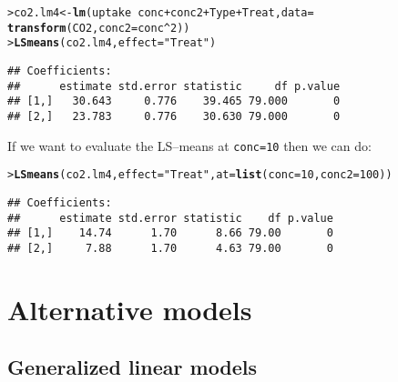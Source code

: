 \documentclass[11pt]{article}\usepackage[]{graphicx}\usepackage[]{color}
\makeatletter
\newcommand{\hlnum}[1]{\textcolor[rgb]{0.686,0.059,0.569}{#1}}%
\newcommand{\hlstr}[1]{\textcolor[rgb]{0.192,0.494,0.8}{#1}}%
\newcommand{\hlopt}[1]{\textcolor[rgb]{0,0,0}{#1}}%
\newcommand{\hlstd}[1]{\textcolor[rgb]{0.345,0.345,0.345}{#1}}%
\newcommand{\hlkwb}[1]{\textcolor[rgb]{0.69,0.353,0.396}{#1}}%
\newcommand{\hlkwc}[1]{\textcolor[rgb]{0.333,0.667,0.333}{#1}}%
\newcommand{\hlkwd}[1]{\textcolor[rgb]{0.737,0.353,0.396}{\textbf{#1}}}%
\newenvironment{kframe}{%
 \def\at@end@of@kframe{}%
 \ifinner\ifhmode%
  \def\at@end@of@kframe{\end{minipage}}%
  \begin{minipage}{\columnwidth}%
 \fi\fi%
 \def\FrameCommand##1{\hskip\@totalleftmargin \hskip-\fboxsep
 \colorbox{shadecolor}{##1}\hskip-\fboxsep
     \hskip-\linewidth \hskip-\@totalleftmargin \hskip\columnwidth}%
 \MakeFramed {\advance\hsize-\width
   \@totalleftmargin\z@ \linewidth\hsize
   \@setminipage}}%
 {\par\unskip\endMakeFramed%
 \at@end@of@kframe}
\newenvironment{knitrout}{}{} %
\def\code#1{\texttt{#1}}
\renewenvironment{knitrout}{
  \begin{oldknitrout}
    \footnotesize
    \topsep=0pt
}{
  \end{oldknitrout}
}
\makeatother
\begin{document}
\begin{knitrout}
\color{fgcolor}\begin{kframe}
\begin{alltt}
\hlstd{> }\hlstd{co2.lm4} \hlkwb{<-} \hlkwd{lm}\hlstd{(uptake} \hlopt{~} \hlstd{conc} \hlopt{+} \hlstd{conc2} \hlopt{+} \hlstd{Type} \hlopt{+} \hlstd{Treat,} \hlkwc{data}\hlstd{=}
\hlstd{  }              \hlkwd{transform}\hlstd{(CO2,} \hlkwc{conc2}\hlstd{=conc}\hlopt{^}\hlnum{2}\hlstd{))}
\hlstd{> }\hlkwd{LSmeans}\hlstd{(co2.lm4,} \hlkwc{effect}\hlstd{=}\hlstr{"Treat"}\hlstd{)}
\end{alltt}
\begin{verbatim}
## Coefficients:
##      estimate std.error statistic     df p.value
## [1,]   30.643     0.776    39.465 79.000       0
## [2,]   23.783     0.776    30.630 79.000       0
\end{verbatim}
\end{kframe}
\end{knitrout}

If we want to evaluate the LS--means at \code{conc=10} then we can do:
\begin{knitrout}
\color{fgcolor}\begin{kframe}
\begin{alltt}
\hlstd{> }\hlkwd{LSmeans}\hlstd{(co2.lm4,} \hlkwc{effect}\hlstd{=}\hlstr{"Treat"}\hlstd{,} \hlkwc{at}\hlstd{=}\hlkwd{list}\hlstd{(}\hlkwc{conc}\hlstd{=}\hlnum{10}\hlstd{,} \hlkwc{conc2}\hlstd{=}\hlnum{100}\hlstd{))}
\end{alltt}
\begin{verbatim}
## Coefficients:
##      estimate std.error statistic    df p.value
## [1,]    14.74      1.70      8.66 79.00       0
## [2,]     7.88      1.70      4.63 79.00       0
\end{verbatim}
\end{kframe}
\end{knitrout}


 

\section{Alternative models}
\label{sec:alternative-models}

\subsection{Generalized linear models}
\label{sec:gener-line-models}
\end{document}

